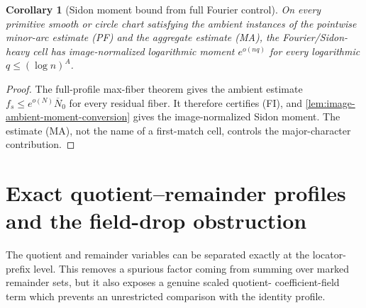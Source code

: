 \documentclass[12pt,a4paper]{amsart}
\numberwithin{equation}{section}
\newtheorem{corollary}[corollary]{Corollary}
\theoremstyle{remark}
\newcommand{\barN}{\overline N}
\begin{document}
\begin{corollary}[Sidon moment bound from full Fourier control]\label{cor:fourier-sidon-paid-smooth-circle}
On every primitive smooth or circle chart satisfying the ambient
instances of the pointwise minor-arc estimate \textup{(PF)} and the
aggregate estimate \textup{(MA)}, the
Fourier/Sidon-heavy cell has image-normalized logarithmic moment
\(e^{o(nq)}\) for every logarithmic \(q\le(\log n)^A\).
\end{corollary}

\begin{proof}
The full-profile max-fiber theorem gives the ambient estimate
\(f_s\le e^{o(N)}\barN_0\) for every residual fiber.  It therefore
certifies \textup{(FI)}, and
\cref{lem:image-ambient-moment-conversion} gives the image-normalized
Sidon moment.  The estimate \textup{(MA)}, not the name of a first-match
cell, controls the major-character contribution.
\end{proof}

\section{Exact quotient--remainder profiles and the field-drop obstruction}
\label{sec:quotient-obstruction}

The quotient and remainder variables can be separated exactly at the
locator-prefix level.  This removes a spurious factor coming from summing
over marked remainder sets, but it also exposes a genuine scaled quotient-
coefficient-field term which prevents an unrestricted comparison with the
identity profile.
\end{document}
